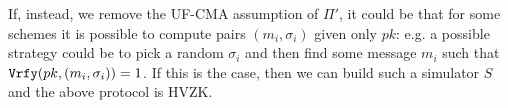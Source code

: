 \begin{enumerate}[(a)]
\begin{solution}
		If, instead, we remove the UF-CMA assumption of $\Pi'$, it could be that for some schemes it is possible to compute pairs $(m_i, \sigma_i)$ given only $pk$: e.g. a possible strategy could be to pick a random $\sigma_i$ and then find some message $m_i$ such that $\texttt{Vrfy}(pk, (m_i, \sigma_i)) = 1$. If this is the case, then we can build such a simulator $S$ and the above protocol is HVZK.
	\end{solution}
\end{enumerate}